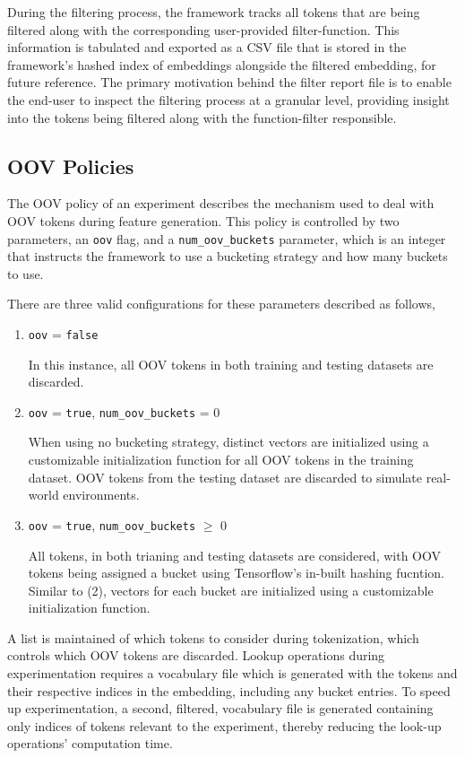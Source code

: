 \documentclass[../../fyp.tex]{subfiles}
\begin{document}
During the filtering process, the framework tracks all tokens that are being filtered along with the corresponding user-provided filter-function. This information is tabulated and exported as a CSV file that is stored in the framework's hashed index of embeddings alongside the filtered embedding, for future reference. The primary motivation behind the filter report file is to enable the end-user to inspect the filtering process at a granular level, providing insight into the tokens being filtered along with the function-filter responsible.

\subsection{OOV Policies}
The OOV policy of an experiment describes the mechanism used to deal with OOV tokens during feature generation. This policy is controlled by two parameters, an \texttt{oov} flag, and a \texttt{num\_oov\_buckets} parameter, which is an integer that instructs the framework to use a bucketing strategy and how many buckets to use.

There are three valid configurations for these parameters described as follows, 

\begin{enumerate}
\item \texttt{oov} = \texttt{false} 

In this instance, all OOV tokens in both training and testing datasets are discarded.

\item \texttt{oov} = \texttt{true}, \texttt{num\_oov\_buckets} = 0

When using no bucketing strategy, distinct vectors are initialized using a customizable initialization function for all OOV tokens in the training dataset. OOV tokens from the testing dataset are discarded to simulate real-world environments.

\item \texttt{oov} = \texttt{true}, \texttt{num\_oov\_buckets} $\geqslant$ 0

All tokens, in both trianing and testing datasets are considered, with OOV tokens being assigned a bucket using Tensorflow's in-built hashing fucntion. Similar to (2), vectors for each bucket are initialized using a customizable initialization function.
\end{enumerate}

A list is maintained of which tokens to consider during tokenization, which controls which OOV tokens are discarded. Lookup operations during experimentation requires a vocabulary file which is generated with the tokens and their respective indices in the embedding, including any bucket entries. To speed up experimentation, a second, filtered, vocabulary file is generated containing only indices of tokens relevant to the experiment, thereby reducing the look-up operations' computation time.
\end{document}
